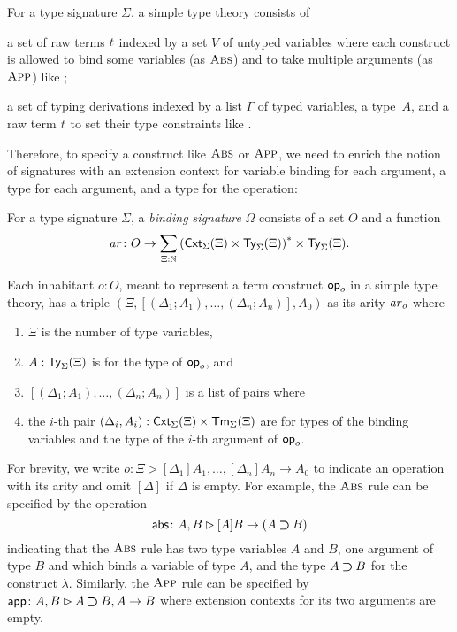 For a type signature $\Sigma$, a simple type theory consists of
\begin{enumerate*}
  \item a set of raw terms $\isTerm{t}$ indexed by a set $V$ of untyped variables where each construct is allowed to bind some variables (as $\textnormal{\textsc{Abs}}$) and to take multiple arguments (as $\textnormal{\textsc{App}}$) like ;
  \item a set of typing derivations indexed by a list $\Gamma$ of typed variables, a type~$A$, and a raw term $\isTerm{t}$ to set their type constraints like . 
\end{enumerate*}
Therefore, to specify a construct like $\textnormal{\textsc{Abs}}$ or $\textnormal{\textsc{App}}$, we need to enrich the notion of signatures with an extension context for variable binding for each argument, a type for each argument, and a type for the operation:
\begin{definition}\label{def:binding-signature}
  For a type signature $\Sigma$, a \emph{binding signature} $\Omega$ consists of a set $O$ and a function
  \[
    \mathit{ar}\colon O \to \sum_{\Xi : \mathbb{N}} \left(\mathsf{Cxt}_\Sigma(\Xi) \times \mathsf{Ty}_\Sigma(\Xi)\right)^* \times \mathsf{Ty}_\Sigma(\Xi).
  \]
\end{definition}
Each inhabitant $o: O$, meant to represent a term construct $\mathsf{op}_o$ in a simple type theory, has a triple $\left(\Xi, \left[\left(\Delta_1; A_1\right), \ldots, \left(\Delta_{n}; A_{n}\right) \right], A_0\right)$ as its arity $\mathit{ar}_o$ where
\begin{enumerate}
  \item $\Xi$ is the number of type variables, 
  \item $A : \mathsf{Ty}_\Sigma(\Xi)$ is for the type of $\mathsf{op}_o$, and
  \item $\left[\left(\Delta_1; A_{1}\right), \ldots, \left(\Delta_{n}; A_{n}\right) \right]$ is a list of pairs where
  \item the $i$-th pair $(\Delta_i, A_i) :\mathsf{Cxt}_{\Sigma}(\Xi) \times \mathsf{Tm}_{\Sigma}(\Xi)$ are for types of the binding variables and the type of the $i$-th argument of $\mathsf{op}_{o}$.
\end{enumerate}
For brevity, we write $o \colon \Xi \rhd [\Delta_1]A_{1}, \ldots, \left[\Delta_{n}\right] A_{n} \to A_0$ to indicate an operation with its arity and omit $[\Delta]$ if $\Delta$ is empty. 
For example, the $\textnormal{\textsc{Abs}}$ rule can be specified by the operation 
\[
  \mathsf{abs}\colon A , B \rhd [A]B \to (A \mathbin{\bm{\supset}} B)
\]
indicating that the $\textnormal{\textsc{Abs}}$ rule has two type variables $A$ and $B$, one argument of type $B$ and which binds a variable of type $A$, and the type $A \mathbin{\bm{\supset}} B$ for the construct $\lambda$.
Similarly, the $\textnormal{\textsc{App}}$ rule can be specified by $\mathsf{app}\colon A, B \rhd A \mathbin{\bm{\supset}} B, A \to B$ where extension contexts for its two arguments are empty.


